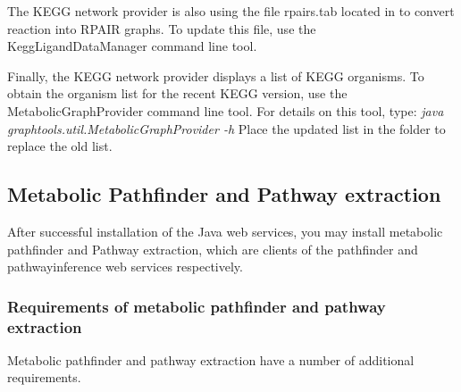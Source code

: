 \documentclass{book}
\begin{document}
The KEGG network provider is also using the file rpairs.tab located in
 to convert reaction into RPAIR graphs. To
update this file, use the KeggLigandDataManager command line tool.

Finally, the KEGG network provider displays a list of KEGG organisms. To obtain the
organism list for the recent KEGG version, use the MetabolicGraphProvider command line
tool. For details on this tool, type: \textit{java graphtools.util.MetabolicGraphProvider -h}
Place the updated list in the folder  to replace the old list.

\subsection{Metabolic Pathfinder and Pathway extraction}
After successful installation of the Java web services, you may install metabolic pathfinder
and Pathway extraction, which are clients of the pathfinder and pathwayinference web services respectively.

\subsubsection{Requirements of metabolic pathfinder and pathway extraction}

Metabolic pathfinder and pathway extraction have a number of additional requirements.
\end{document}
